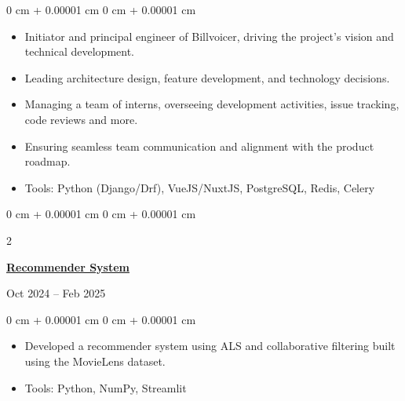 \documentclass[10pt, letterpaper]{article}
\newenvironment{highlights}{
    \begin{itemize}[
        topsep=0.10 cm,
        parsep=0.10 cm,
        partopsep=0pt,
        itemsep=0pt,
        leftmargin=0 cm + 10pt
    ]
}{
    \end{itemize}
} %
\newenvironment{onecolentry}{
    \begin{adjustwidth}{
        0 cm + 0.00001 cm
    }{
        0 cm + 0.00001 cm
    }
}{
    \end{adjustwidth}
} %
\newenvironment{twocolentry}[2][]{
    \onecolentry
    \def\secondColumn{#2}
    \setcolumnwidth{\fill, 3.5 cm} %
    \begin{paracol}{2}
}{
    \switchcolumn \raggedleft \secondColumn
    \end{paracol}
    \endonecolentry
} %
\let\hrefWithoutArrow\href
\begin{document}
            \vspace{0.10 cm}
            \begin{onecolentry}
                \begin{highlights}
                    \item Initiator and principal engineer of Billvoicer, driving the project's vision and technical development.
                    
                        
                            \item Leading architecture design, feature development, and technology decisions.
                        
                            \item Managing a team of interns, overseeing development activities, issue tracking, code reviews and more.
                        
                            \item Ensuring seamless team communication and alignment with the product roadmap.
                        
                    
                    \item Tools: Python (Django/Drf), VueJS/NuxtJS, PostgreSQL, Redis, Celery
                \end{highlights}
            \end{onecolentry}
            \vspace{0.2 cm}
        
            \begin{twocolentry}{
                Oct 2024 -- Feb 2025
            }
                
                    \hrefWithoutArrow{https://github.com/hjisaac/recommender-system}{\textbf{Recommender System} \faGithub{}}
                
            \end{twocolentry}

            \vspace{0.10 cm}
            \begin{onecolentry}
                \begin{highlights}
                    \item Developed a recommender system using ALS and collaborative filtering built using the MovieLens dataset.
                    
                    \item Tools: Python, NumPy, Streamlit
                \end{highlights}
            \end{onecolentry}
            \vspace{0.2 cm}
        
\end{document}

